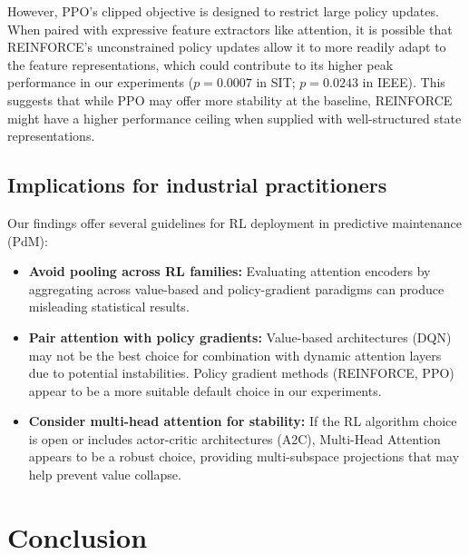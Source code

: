 \documentclass[sn-basic]{sn-jnl}%
\begin{document}
However, \textsc{PPO}'s clipped objective is designed to restrict large policy updates. When paired with expressive feature extractors like attention, it is possible that \textsc{REINFORCE}'s unconstrained policy updates allow it to more readily adapt to the feature representations, which could contribute to its higher peak performance in our experiments ($p = 0.0007$ in SIT; $p = 0.0243$ in IEEE). This suggests that while \textsc{PPO} may offer more stability at the baseline, \textsc{REINFORCE} might have a higher performance ceiling when supplied with well-structured state representations.

\subsection{Implications for industrial practitioners}
Our findings offer several guidelines for RL deployment in predictive maintenance (PdM):
\begin{itemize}
    \item \textbf{Avoid pooling across RL families:} Evaluating attention encoders by aggregating across value-based and policy-gradient paradigms can produce misleading statistical results. 
    \item \textbf{Pair attention with policy gradients:} Value-based architectures (\textsc{DQN}) may not be the best choice for combination with dynamic attention layers due to potential instabilities. Policy gradient methods (\textsc{REINFORCE}, \textsc{PPO}) appear to be a more suitable default choice in our experiments.
    \item \textbf{Consider multi-head attention for stability:} If the RL algorithm choice is open or includes actor-critic architectures (\textsc{A2C}), Multi-Head Attention appears to be a robust choice, providing multi-subspace projections that may help prevent value collapse.
\end{itemize}


\section{Conclusion} \label{sec:conclusion}
\end{document}
